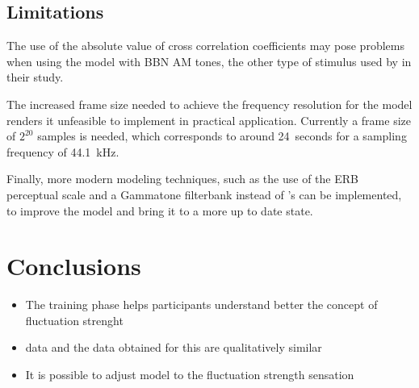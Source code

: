 \documentclass[../main.tex]{subfiles}
\begin{document}
\subsection{Limitations}

The use of the absolute value of cross correlation coefficients may pose
problems when using the model with \gls{BBN} \gls{AM} tones, the other type
of stimulus used by \citeauthor{Fastl2007Psychoacoustics} in their study.

The increased frame size needed to achieve the frequency resolution for the
model renders it unfeasible to implement in practical application. Currently
a frame size of $2^{20}$ samples is needed, which corresponds to around
24~seconds for a sampling frequency of 44.1~kHz.

Finally, more modern modeling techniques, such as the use of the ERB perceptual
scale and a Gammatone filterbank instead of \citeauthor{Terhardt1979}'s can be
implemented, to improve the model and bring it to a more up to date state.

\section{Conclusions}

\begin{itemize}
  \item The training phase helps participants understand better the concept of
    fluctuation strenght
  \item \citeauthor{Fastl2007Psychoacoustics} data and the data obtained for
    this are qualitatively similar
  \item It is possible to adjust \citeauthor{daniel1997psychoacoustical} model
    to the fluctuation strength sensation
\end{itemize}
\end{document}
